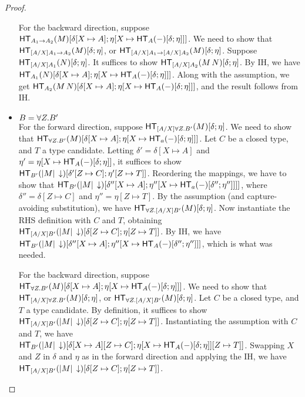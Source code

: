 \documentclass{article}
\begin{document}
\begin{proof}
\begin{itemize}
For the backward direction, suppose
$\mathsf{HT}_{A_1 \to A_2}(M)[\delta[X \mapsto A];\eta[X \mapsto \mathsf{HT}_{A}(-)[\delta;\eta]]]$.
We need to show that $\mathsf{HT}_{[A/X]A_1 \to A_2}(M)[\delta;\eta]$,
or $\mathsf{HT}_{[A/X]A_1 \to [A/X]A_2}(M)[\delta;\eta]$. Suppose $\mathsf{HT}_{[A/X]A_1}(N)[\delta;\eta]$.
It suffices to show $\mathsf{HT}_{[A/X]A_2}(M\,N)[\delta;\eta]$. By IH, we have
$\mathsf{HT}_{A_1}(N)[\delta[X \mapsto A];\eta[X \mapsto \mathsf{HT}_{A}(-)[\delta;\eta]]]$.
Along with the assumption, we get $\mathsf{HT}_{A_2}(M\,N)[\delta[X \mapsto A];\eta[X \mapsto \mathsf{HT}_{A}(-)[\delta;\eta]]]$, and the result follows from IH.

\item $B = \forall Z. B'$\\
For the forward direction, suppose $\mathsf{HT}_{[A/X]\forall Z. B'}(M)[\delta;\eta]$. We need to show that
$\mathsf{HT}_{\forall Z. B'}(M)[\delta[X \mapsto A];\eta[X \mapsto \mathsf{HT}_{a}(-)[\delta;\eta]]]$. Let $C$ be a closed type,
and $T$ a type candidate. Letting $\delta' = \delta[X \mapsto A]$ and
$\eta' = \eta[X \mapsto \mathsf{HT}_{A}(-)[\delta;\eta]]$, it suffices to show
$\mathsf{HT}_{B'}(|M|\,\downarrow)[\delta'[Z \mapsto C];\eta'[Z \mapsto T]]$.
Reordering the mappings, we have to show that
$\mathsf{HT}_{B'}(|M|\,\downarrow)[\delta''[X \mapsto A];\eta''[X \mapsto \mathsf{HT}_{a}(-)[\delta'';\eta'']]]]$, where $\delta'' = \delta[Z \mapsto C]$ and $\eta'' = \eta[Z \mapsto T]$.
By the assumption (and
capture-avoiding substitution), we have $\mathsf{HT}_{\forall Z. [A/X]B'}(M)[\delta;\eta]$.
Now instantiate the RHS definition with $C$ and $T$, obtaining
$\mathsf{HT}_{[A/X]B'}(|M|\,\downarrow)[\delta[Z \mapsto C];\eta[Z \mapsto T]]$.
By IH, we have
$\mathsf{HT}_{B'}(|M|\,\downarrow)[\delta''[X \mapsto A];\eta''[X \mapsto \mathsf{HT}_{A}(-)[\delta'';\eta'']]]$,
which is what was needed.

For the backward direction, suppose
$\mathsf{HT}_{\forall Z. B'}(M)[\delta[X \mapsto A];\eta[X \mapsto \mathsf{HT}_{A}(-)[\delta;\eta]]]$.
We need to show that $\mathsf{HT}_{[A/X]\forall Z. B'}(M)[\delta;\eta]$, or $\mathsf{HT}_{\forall Z. [A/X]B'}(M)[\delta;\eta]$.
Let $C$ be a closed type, and $T$ a type candidate. By definition, it suffices
to show $\mathsf{HT}_{[A/X]B'}(|M|\,\downarrow)[\delta[Z \mapsto C];\eta[Z \mapsto T]]$.
Instantiating the assumption with $C$ and $T$, we have $\mathsf{HT}_{B'}(|M|\,\downarrow)[\delta[X \mapsto A][Z \mapsto C];\eta[X \mapsto \mathsf{HT}_{A}(-)[\delta;\eta]][Z \mapsto T]]$.
Swapping $X$ and $Z$ in $\delta$ and $\eta$ as in the forward direction and applying the IH, we have $\mathsf{HT}_{[A/X]B'}(|M|\,\downarrow)[\delta[Z \mapsto C];\eta[Z \mapsto T]]$.
\end{itemize}
\end{proof}
\end{document}
